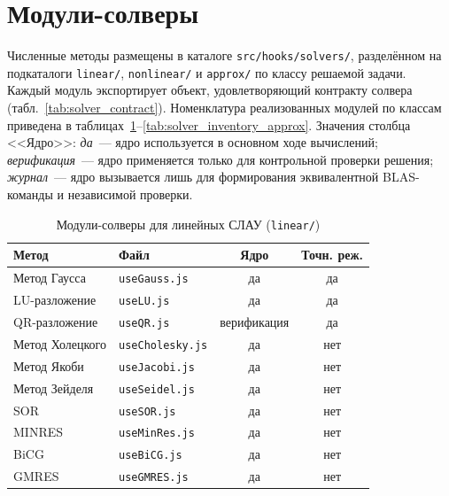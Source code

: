 \documentclass[12pt, oneside]{book}
\begin{document}
\section{Модули-солверы}

    \quad Численные методы размещены в каталоге \texttt{src/hooks/solv\-ers/}, разделённом на подкаталоги \texttt{linear/}, \texttt{nonlinear/} и \texttt{approx/} по классу решаемой задачи. Каждый модуль экспортирует объект, удовлетворяющий контракту солвера (табл.~\ref{tab:solver_contract}). Номенклатура реализованных модулей по классам приведена в таблицах~\ref{tab:solver_inventory_linear}--\ref{tab:solver_inventory_approx}. Значения столбца <<Ядро>>: \textit{да}~--- ядро используется в основном ходе вычислений; \textit{верификация}~--- ядро применяется только для контрольной проверки решения; \textit{журнал}~--- ядро вызывается лишь для формирования эквивалентной BLAS-команды и независимой проверки.

\begin{table}[H]
\centering
\scriptsize
\renewcommand{\arraystretch}{1.15}
\begin{tabular}{|p{3.5cm}|p{3.0cm}|c|c|}
\hline
\rowcolor{thbg} \textbf{Метод} & \textbf{Файл} & \textbf{Ядро} & \textbf{Точн. реж.} \\
\hline
Метод Гаусса & \texttt{useGauss.js} & да & да \\ \hline
LU-разложение & \texttt{useLU.js} & да & да \\ \hline
QR-разложение & \texttt{useQR.js} & верификация & да \\ \hline
Метод Холецкого & \texttt{useCholesky.js} & да & нет \\ \hline
Метод Якоби & \texttt{useJacobi.js} & да & нет \\ \hline
Метод Зейделя & \texttt{useSeidel.js} & да & нет \\ \hline
SOR & \texttt{useSOR.js} & да & нет \\ \hline
MINRES & \texttt{useMinRes.js} & да & нет \\ \hline
BiCG & \texttt{useBiCG.js} & да & нет \\ \hline
GMRES & \texttt{useGMRES.js} & да & нет \\ \hline
\end{tabular}
\caption{Модули-солверы для линейных СЛАУ (\texttt{linear/})}
\label{tab:solver_inventory_linear}
\end{table}
\end{document}

